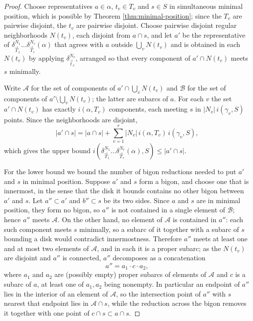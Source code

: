 \documentclass[12pt,a4paper]{amsart}
\numberwithin{equation}{section}
\theoremstyle{plain}
\theoremstyle{definition}
\theoremstyle{remark}
\begin{document}
\begin{proof}
    Choose representatives $a \in \alpha$, $t_v \in T_v$ and $s \in S$ in simultaneous minimal position, which is possible by Theorem \ref{thm:minimal-position}; since the $T_v$ are pairwise disjoint, the $t_v$ are pairwise disjoint.
    Choose pairwise disjoint regular neighborhoods $N(t_v)$, each disjoint from $a \cap s$, and let $a'$ be the representative of $\delta_{\vec T_1}^{N_1} \dots \delta_{\vec T_r}^{N_r}(\alpha)$ that agrees with $a$ outside $\bigcup_v N(t_v)$ and is obtained in each $N(t_v)$ by applying $\delta_{\vec t_v}^{N_v}$, arranged so that every component of $a' \cap N(t_v)$ meets $s$ minimally.

    Write $\mathcal{A}$ for the set of components of $a' \cap \bigcup_v N(t_v)$ and $\mathcal{B}$ for the set of components of $a' \setminus \bigcup_v N(t_v)$; the latter are subarcs of $a$.
    For each $v$ the set $a' \cap N(t_v)$ has exactly $i(\alpha, T_v)$ components, each meeting $s$ in $\lvert N_v \rvert \, i(\gamma_v, S)$ points.
    Since the neighborhoods are disjoint,
    \[
        \lvert a' \cap s \rvert
        = \lvert a \cap s \rvert + \sum_{v=1}^{r} \lvert N_v \rvert \, i(\alpha, T_v) \, i(\gamma_v, S),
    \]
    which gives the upper bound $i(\delta_{\vec T_1}^{N_1} \dots \delta_{\vec T_r}^{N_r}(\alpha), S) \le \lvert a' \cap s \rvert$.

    For the lower bound we bound the number of bigon reductions needed to put $a'$ and $s$ in minimal position.
    Suppose $a'$ and $s$ form a bigon, and choose one that is innermost, in the sense that the disk it bounds contains no other bigon between $a'$ and $s$.
    Let $a'' \subset a'$ and $b'' \subset s$ be its two sides.
    Since $a$ and $s$ are in minimal position, they form no bigon, so $a''$ is not contained in a single element of $\mathcal{B}$; hence $a''$ meets $\mathcal{A}$.
    On the other hand, no element of $\mathcal{A}$ is contained in $a''$: each such component meets $s$ minimally, so a subarc of it together with a subarc of $s$ bounding a disk would contradict innermostness.
    Therefore $a''$ meets at least one and at most two elements of $\mathcal{A}$, and in each it is a proper subarc; as the $N(t_v)$ are disjoint and $a''$ is connected, $a''$ decomposes as a concatenation
    \[
        a'' = a_1 \cdot c \cdot a_2 ,
    \]
    where $a_1$ and $a_2$ are (possibly empty) proper subarcs of elements of $\mathcal{A}$ and $c$ is a subarc of $a$, at least one of $a_1, a_2$ being nonempty.
    In particular an endpoint of $a''$ lies in the interior of an element of $\mathcal{A}$, so the intersection point of $a''$ with $s$ nearest that endpoint lies in $\mathcal{A} \cap s$, while the reduction across the bigon removes it together with one point of $c \cap s \subset a \cap s$.


\end{proof}
\end{document}
